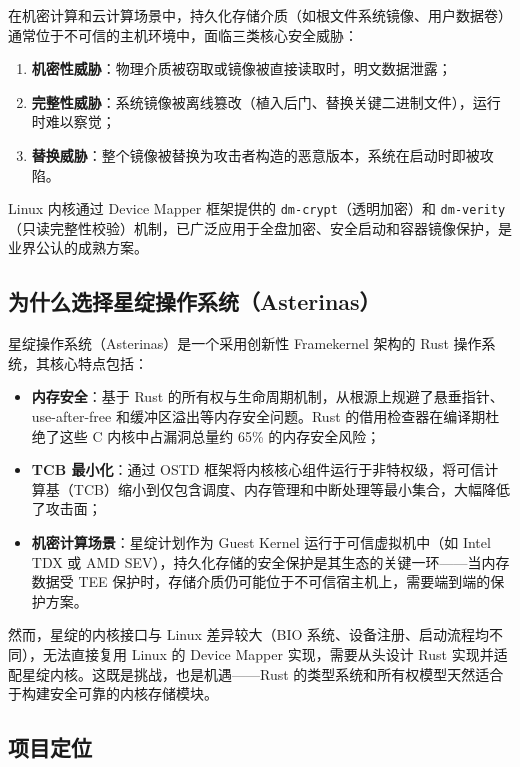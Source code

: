 在机密计算和云计算场景中，持久化存储介质（如根文件系统镜像、用户数据卷）通常位于不可信的主机环境中，面临三类核心安全威胁：

\begin{enumerate}
    \item \textbf{机密性威胁}：物理介质被窃取或镜像被直接读取时，明文数据泄露；
    \item \textbf{完整性威胁}：系统镜像被离线篡改（植入后门、替换关键二进制文件），运行时难以察觉；
    \item \textbf{替换威胁}：整个镜像被替换为攻击者构造的恶意版本，系统在启动时即被攻陷。
\end{enumerate}

Linux 内核通过 Device Mapper 框架提供的 \texttt{dm-crypt}（透明加密）和 \texttt{dm-verity}（只读完整性校验）机制，已广泛应用于全盘加密、安全启动和容器镜像保护，是业界公认的成熟方案。

\subsection{为什么选择星绽操作系统（Asterinas）}

星绽操作系统（Asterinas）是一个采用创新性 Framekernel 架构的 Rust 操作系统，其核心特点包括：

\begin{itemize}
    \item \textbf{内存安全}：基于 Rust 的所有权与生命周期机制，从根源上规避了悬垂指针、use-after-free 和缓冲区溢出等内存安全问题。Rust 的借用检查器在编译期杜绝了这些 C 内核中占漏洞总量约 65\% 的内存安全风险；
    \item \textbf{TCB 最小化}：通过 OSTD 框架将内核核心组件运行于非特权级，将可信计算基（TCB）缩小到仅包含调度、内存管理和中断处理等最小集合，大幅降低了攻击面；
    \item \textbf{机密计算场景}：星绽计划作为 Guest Kernel 运行于可信虚拟机中（如 Intel TDX 或 AMD SEV），持久化存储的安全保护是其生态的关键一环——当内存数据受 TEE 保护时，存储介质仍可能位于不可信宿主机上，需要端到端的保护方案。
\end{itemize}

然而，星绽的内核接口与 Linux 差异较大（BIO 系统、设备注册、启动流程均不同），无法直接复用 Linux 的 Device Mapper 实现，需要从头设计 Rust 实现并适配星绽内核。这既是挑战，也是机遇——Rust 的类型系统和所有权模型天然适合于构建安全可靠的内核存储模块。

\subsection{项目定位}

